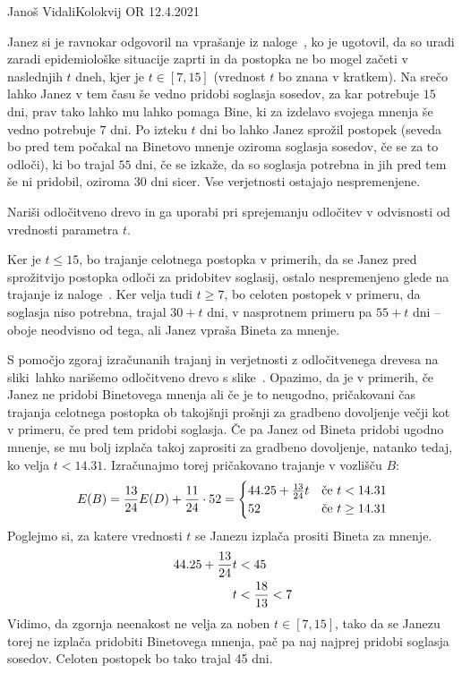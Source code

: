 \begin{naloga}{Janoš Vidali}{Kolokvij OR 12.4.2021}
\begin{vprasanje}
Janez si je ravnokar odgovoril na vprašanje iz naloge~\nal[zemlja],
ko je ugotovil,
da so uradi zaradi epidemiološke situacije zaprti
in da postopka ne bo mogel začeti v naslednjih $t$ dneh,
kjer je $t \in [7, 15]$
(vrednost $t$ bo znana v kratkem).
Na srečo lahko Janez v tem času še vedno pridobi soglasja sosedov,
za kar potrebuje $15$ dni,
prav tako lahko mu lahko pomaga Bine,
ki za izdelavo svojega mnenja še vedno potrebuje $7$ dni.
Po izteku $t$ dni bo lahko Janez sprožil postopek
(seveda bo pred tem počakal na Binetovo mnenje oziroma soglasja sosedov,
če se za to odloči),
ki bo trajal $55$ dni, če se izkaže,
da so soglasja potrebna in jih pred tem še ni pridobil,
oziroma $30$ dni sicer.
Vse verjetnosti ostajajo nespremenjene.

Nariši odločitveno drevo
in ga uporabi pri sprejemanju odločitev v odvisnosti od vrednosti parametra $t$.
\end{vprasanje}

\begin{odgovor}
Ker je $t \le 15$, bo trajanje celotnega postopka v primerih,
da se Janez pred sprožitvijo postopka odloči za pridobitev soglasij,
ostalo nespremenjeno glede na trajanje iz naloge~\res[zemlja].
Ker velja tudi $t \ge 7$,
bo celoten postopek v primeru, da soglasja niso potrebna, trajal $30+t$ dni,
v nasprotnem primeru pa $55+t$ dni
-- oboje neodvisno od tega, ali Janez vpraša Bineta za mnenje.

S pomočjo zgoraj izračunanih trajanj
in verjetnosti z odločitvenega drevesa na sliki~\fig[zemlja]
lahko narišemo odločitveno drevo s slike~\fig.
Opazimo,
da je v primerih,
če Janez ne pridobi Binetovega mnenja ali če je to neugodno,
pričakovani čas trajanja celotnega postopka
ob takojšnji prošnji za gradbeno dovoljenje
večji kot v primeru, če pred tem pridobi soglasja.
Če pa Janez od Bineta pridobi ugodno mnenje,
se mu bolj izplača takoj zaprositi za gradbeno dovoljenje,
natanko tedaj, ko velja $t < 14.31$.
Izračunajmo torej pričakovano trajanje v vozlišču $B$:
$$
E(B) = {13 \over 24} E(D) + {11 \over 24} \cdot 52 =
\begin{cases}
44.25 + {13 \over 24} t & \text{če $t < 14.31$} \\
52 & \text{če $t \ge 14.31$}
\end{cases}
$$
Poglejmo si, za katere vrednosti $t$ se Janezu izplača prositi Bineta za mnenje.
\begin{align*}
44.25 + {13 \over 24} t &< 45 \\
t &< {18 \over 13} < 7
\end{align*}
Vidimo, da zgornja neenakost ne velja za noben $t \in [7, 15]$,
tako da se Janezu torej ne izplača pridobiti Binetovega mnenja,
pač pa naj najprej pridobi soglasja sosedov.
Celoten postopek bo tako trajal 45 dni.
\begin{slika}
\makebox[\textwidth][c]{
\pgfslika
}
\end{slika}
\end{odgovor}
\end{naloga}
